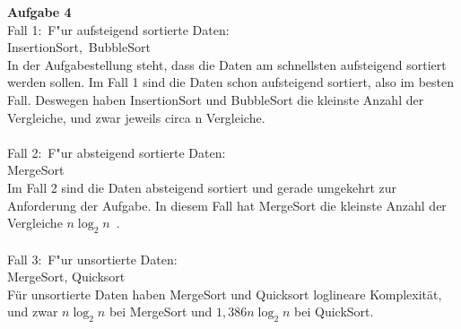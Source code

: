 \documentclass[12pt,a4paper]{article}
\begin{document}
\noindent \textbf{Aufgabe 4} \\
Fall 1:\ F"ur aufsteigend sortierte Daten:\\
\indent\indent InsertionSort,\ BubbleSort\\
In der Aufgabestellung steht, dass die Daten am schnellsten aufsteigend sortiert werden sollen. Im Fall 1 sind die Daten schon aufsteigend sortiert, also im besten Fall. Deswegen haben InsertionSort und BubbleSort die kleinste Anzahl der Vergleiche, und zwar jeweils circa n Vergleiche.\\\\
Fall 2:\ F"ur absteigend sortierte Daten:\\
\indent\indent MergeSort\\
Im Fall 2 sind die Daten absteigend sortiert und gerade umgekehrt zur Anforderung der Aufgabe. In diesem Fall hat MergeSort die kleinste Anzahl der Vergleiche $n\log_{2}n$\ .\\\\
Fall 3:\ F"ur unsortierte Daten:\\
\indent\indent MergeSort, Quicksort\\
F\"ur unsortierte Daten haben MergeSort und Quicksort loglineare Komplexit\"at, und zwar $n\log_{2}n$ bei MergeSort und $1,386n\log_{2}n$ bei QuickSort.
\end{document}
